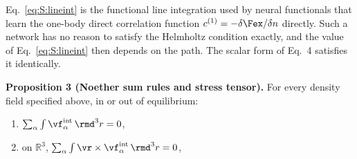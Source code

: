 Eq.~\ref{eq:S:lineint} is the functional line integration used by neural functionals that learn the one-body direct correlation function $c^{(1)}=-\delta\Fex/\delta n$ directly. Such a network has no reason to satisfy the Helmholtz condition exactly, and the value of Eq.~\ref{eq:S:lineint} then depends on the path. The scalar form of Eq.~4 satisfies it identically.

\textbf{Proposition 3 (Noether sum rules and stress tensor).} For every density field specified above, in or out of equilibrium: 
\begin{enumerate}
    \item [i]$\sum_\alpha\int\vf^{\rm int}_\alpha\,\rmd^3r=0$,
    \item [ii]on $\mathbb R^3$, $\sum_\alpha\int\vr\times\vf^{\rm int}_\alpha\,\rmd^3r=0$,
\end{enumerate}

